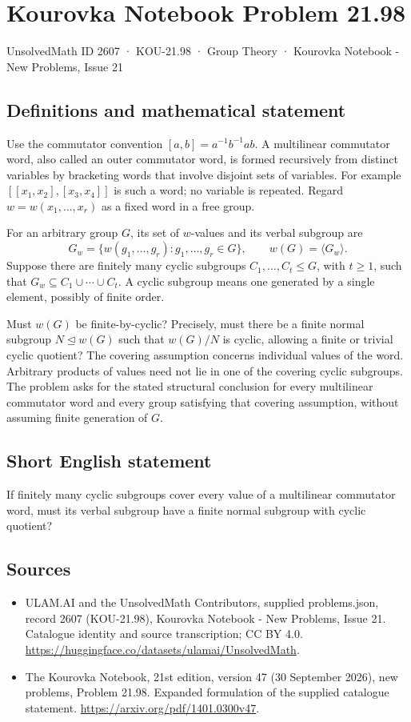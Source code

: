 \documentclass[11pt,a4paper]{article}
\begin{document}
\section*{Kourovka Notebook Problem 21.98}\label{2607}
{\small UnsolvedMath ID 2607 · KOU-21.98 · Group Theory · Kourovka Notebook - New Problems, Issue 21}
\subsection{Definitions and mathematical statement}
Use the commutator convention $[a,b]=a^{-1}b^{-1}ab$. A multilinear commutator word, also called an outer commutator word, is formed recursively from distinct variables by bracketing words that involve disjoint sets of variables. For example $[[x_1,x_2],[x_3,x_4]]$ is such a word; no variable is repeated. Regard $w=w(x_1,\ldots,x_r)$ as a fixed word in a free group.

For an arbitrary group $G$, its set of $w$-values and its verbal subgroup are
\[
 G_w=\{w(g_1,\ldots,g_r):g_1,\ldots,g_r\in G\},
 \qquad w(G)=\langle G_w\rangle.
\]
Suppose there are finitely many cyclic subgroups $C_1,\ldots,C_t\le G$, with $t\ge1$, such that $G_w\subseteq C_1\cup\cdots\cup C_t$. A cyclic subgroup means one generated by a single element, possibly of finite order.

Must $w(G)$ be finite-by-cyclic? Precisely, must there be a finite normal subgroup $N\trianglelefteq w(G)$ such that $w(G)/N$ is cyclic, allowing a finite or trivial cyclic quotient? The covering assumption concerns individual values of the word. Arbitrary products of values need not lie in one of the covering cyclic subgroups. The problem asks for the stated structural conclusion for every multilinear commutator word and every group satisfying that covering assumption, without assuming finite generation of $G$.
\subsection{Short English statement}
If finitely many cyclic subgroups cover every value of a multilinear commutator word, must its verbal subgroup have a finite normal subgroup with cyclic quotient?
\subsection{Sources}
\begin{itemize}
\item[S1] ULAM.AI and the UnsolvedMath Contributors, supplied problems.json, record 2607 (KOU-21.98), Kourovka Notebook - New Problems, Issue 21. Catalogue identity and source transcription; CC BY 4.0.
\url{https://huggingface.co/datasets/ulamai/UnsolvedMath}.
\item[S2] The Kourovka Notebook, 21st edition, version 47 (30 September 2026), new problems, Problem 21.98. Expanded formulation of the supplied catalogue statement.
\url{https://arxiv.org/pdf/1401.0300v47}.
\end{itemize}
\end{document}
